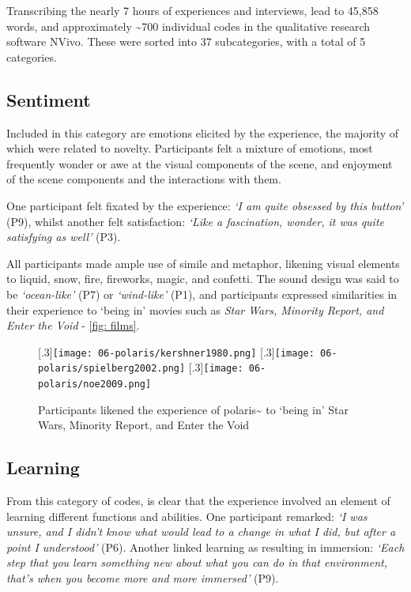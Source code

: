 Transcribing the nearly 7 hours of experiences and interviews, lead to 45,858 words, and approximately \textasciitilde{}700 individual codes in the qualitative research software NVivo. These were sorted into 37 subcategories, with a total of 5 categories.

\subsection{Sentiment}\label{sec: polaris-feedback-sentiment}
Included in this category are emotions elicited by the experience, the majority of which were related to novelty. Participants felt a mixture of emotions, most frequently wonder or awe at the visual components of the scene, and enjoyment of the scene components and the interactions with them.

One participant felt fixated by the experience: \textit{`I am quite obsessed by this button'} (P9), whilst another felt satisfaction: \textit{`Like a fascination, wonder, it was quite satisfying as well'} (P3).

All participants made ample use of simile and metaphor, likening visual elements to liquid, snow, fire, fireworks, magic, and confetti. The sound design was said to be \textit{`ocean-like'} (P7) or \textit{`wind-like'} (P1), and participants expressed similarities in their experience to `being in' movies such as \textit{Star Wars, Minority Report, and Enter the Void} - \autoref{fig: films}.

\begin{figure}
    \centering
    \captionsetup{justification=centering, margin=1.5cm}
    [.3\linewidth]{\texttt{[image: 06-polaris/kershner1980.png]}}\label{fig: kershner1980}
    \hfill
    [.3\linewidth]{\texttt{[image: 06-polaris/spielberg2002.png]}}\label{fig: spielberg2002}
    \hfill
    [.3\linewidth]{\texttt{[image: 06-polaris/noe2009.png]}}\label{fig: noe2009}
    \caption{Participants likened the experience of polaris\textasciitilde{} to `being in' Star Wars, Minority Report, and Enter the Void}\label{fig: films}
\end{figure}

\subsection{Learning}\label{sec: polaris-feedback-learning}
From this category of codes, is clear that the experience involved an element of learning different functions and abilities. One participant remarked: \textit{`I was unsure, and I didn't know what would lead to a change in what I did, but after a point I understood'} (P6). Another linked learning as resulting in immersion: \textit{`Each step that you learn something new about what you can do in that environment, that's when you become more and more immersed'} (P9).

